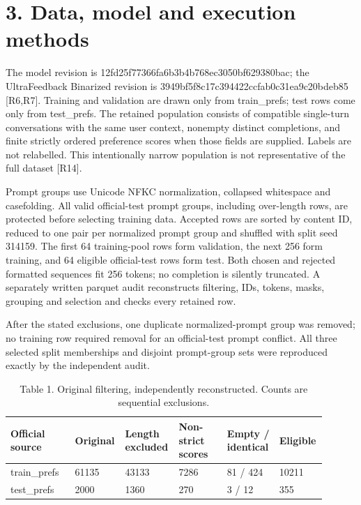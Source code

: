 \documentclass[10pt]{article}
\begin{document}
\section*{3. Data, model and execution methods}

The model revision is 12fd25f77366fa6b3b4b768ec3050bf629380bac; the UltraFeedback Binarized revision is 3949bf5f8c17c394422ccfab0c31ea9c20bdeb85 [R6,R7]. Training and validation are drawn only from train\_prefs; test rows come only from test\_prefs. The retained population consists of compatible single-turn conversations with the same user context, nonempty distinct completions, and finite strictly ordered preference scores when those fields are supplied. Labels are not relabelled. This intentionally narrow population is not representative of the full dataset [R14].


Prompt groups use Unicode NFKC normalization, collapsed whitespace and casefolding. All valid official-test prompt groups, including over-length rows, are protected before selecting training data. Accepted rows are sorted by content ID, reduced to one pair per normalized prompt group and shuffled with split seed 314159. The first 64 training-pool rows form validation, the next 256 form training, and 64 eligible official-test rows form test. Both chosen and rejected formatted sequences fit 256 tokens; no completion is silently truncated. A separately written parquet audit reconstructs filtering, IDs, tokens, masks, grouping and selection and checks every retained row.


After the stated exclusions, one duplicate normalized-prompt group was removed; no training row required removal for an official-test prompt conflict. All three selected split memberships and disjoint prompt-group sets were reproduced exactly by the independent audit.


\begin{table}[htbp]\centering\footnotesize\caption{Table 1. Original filtering, independently reconstructed. Counts are sequential exclusions.}
\begin{tabular}{p{0.204\linewidth}p{0.106\linewidth}p{0.151\linewidth}p{0.159\linewidth}p{0.159\linewidth}p{0.121\linewidth}}
\toprule
Official source & Original & Length excluded & Non-strict scores & Empty / identical & Eligible \\ \midrule
train\_prefs & 61135 & 43133 & 7286 & 81 / 424 & 10211 \\
test\_prefs & 2000 & 1360 & 270 & 3 / 12 & 355 \\
\bottomrule\end{tabular}\end{table}
\end{document}
